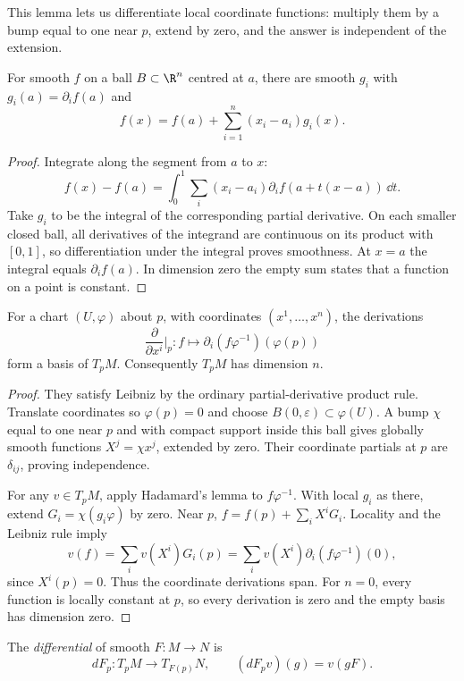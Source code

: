 This lemma lets us differentiate local coordinate functions: multiply them by a bump equal to one near $p$, extend by zero, and the answer is independent of the extension.

\begin{lemma}[Hadamard]\label{lem:hadamard}
For smooth $f$ on a ball $B\subset\R^n$ centred at $a$, there are smooth $g_i$ with $g_i(a)=\partial_if(a)$ and
\[
f(x)=f(a)+\sum_{i=1}^n(x_i-a_i)g_i(x).
\]
\end{lemma}
\begin{proof}
Integrate along the segment from $a$ to $x$:
\[
f(x)-f(a)=\int_0^1\sum_i(x_i-a_i)\partial_if(a+t(x-a))\,\dd t.
\]
Take $g_i$ to be the integral of the corresponding partial derivative. On each smaller closed ball, all derivatives of the integrand are continuous on its product with $[0,1]$, so differentiation under the integral proves smoothness. At $x=a$ the integral equals $\partial_if(a)$. In dimension zero the empty sum states that a function on a point is constant.
\end{proof}

\begin{theorem}\label{thm:tangentbasis}
For a chart $(U,\varphi)$ about $p$, with coordinates $(x^1,\ldots,x^n)$, the derivations
\[
\frac{\partial}{\partial x^i}\Big|_p:f\longmapsto
\partial_i(f\varphi^{-1})(\varphi(p))
\]
form a basis of $T_pM$. Consequently $T_pM$ has dimension $n$.
\end{theorem}
\begin{proof}
They satisfy Leibniz by the ordinary partial-derivative product rule. Translate coordinates so $\varphi(p)=0$ and choose $B(0,\varepsilon)\subset\varphi(U)$. A bump $\chi$ equal to one near $p$ and with compact support inside this ball gives globally smooth functions $X^j=\chi x^j$, extended by zero. Their coordinate partials at $p$ are $\delta_{ij}$, proving independence.

For any $v\in T_pM$, apply Hadamard's lemma to $f\varphi^{-1}$. With local $g_i$ as there, extend $G_i=\chi(g_i\varphi)$ by zero. Near $p$,
$f=f(p)+\sum_iX^iG_i$. Locality and the Leibniz rule imply
\[
v(f)=\sum_i v(X^i)G_i(p)
=\sum_i v(X^i)\partial_i(f\varphi^{-1})(0),
\]
since $X^i(p)=0$. Thus the coordinate derivations span. For $n=0$, every function is locally constant at $p$, so every derivation is zero and the empty basis has dimension zero.
\end{proof}

\begin{definition}
The \emph{differential} of smooth $F:M\to N$ is
\[
dF_p:T_pM\to T_{F(p)}N,\qquad (dF_pv)(g)=v(gF).
\]
\end{definition}

